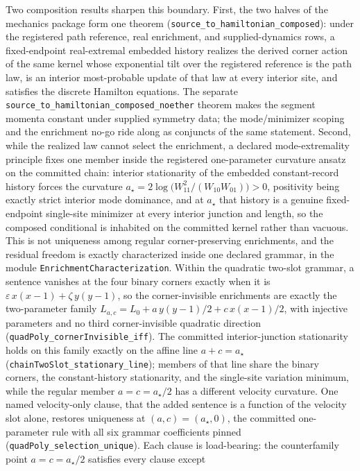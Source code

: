 \documentclass[11pt]{article}
\begin{document}
Two composition results sharpen this boundary. First, the two halves of
the mechanics package form one theorem
(\texttt{source\_to\_hamiltonian\_composed}): under the registered path
reference, real enrichment, and supplied-dynamics rows, a fixed-endpoint
real-extremal embedded history realizes the derived corner action of the
same kernel whose exponential tilt over the registered reference is the
path law, is an interior most-probable update of that law at every
interior site, and satisfies the discrete Hamilton equations. The separate
\texttt{source\_to\_hamiltonian\_composed\_noether} theorem makes the
segment momenta constant under supplied symmetry data; the
mode/minimizer scoping and the enrichment no-go ride along as conjuncts
of the same statement. Second, while the realized law cannot select the
enrichment, a declared mode-extremality principle fixes one member
inside the registered one-parameter curvature ansatz on the committed
chain: interior stationarity of the embedded constant-record history
forces the curvature
\(a_\star=2\log\!\bigl(W_{11}^2/(W_{10}W_{01})\bigr)>0\), positivity
being exactly strict interior mode dominance, and at \(a_\star\) that
history is a genuine fixed-endpoint single-site minimizer at every interior
junction and length, so the
composed conditional is inhabited on the committed kernel rather than
vacuous. This is not uniqueness among regular corner-preserving
enrichments, and the residual freedom is exactly characterized inside one
declared grammar, in the module \texttt{EnrichmentCharacterization}.
Within the quadratic two-slot grammar, a sentence vanishes at the four
binary corners exactly when it is \(\varepsilon\,x(x-1)+\zeta\,y(y-1)\),
so the corner-invisible enrichments are exactly the two-parameter family
\(L_{a,c}=L_0+a\,y(y-1)/2+c\,x(x-1)/2\), with injective parameters and no
third corner-invisible quadratic direction
(\texttt{quadPoly\_cornerInvisible\_iff}). The committed interior-junction
stationarity holds on this family exactly on the affine line
\(a+c=a_\star\) (\texttt{chainTwoSlot\_stationary\_line}); members of that
line share the binary corners, the constant-history stationarity, and the
single-site variation minimum, while the regular member
\(a=c=a_\star/2\) has a different velocity curvature. One named
velocity-only clause, that the added sentence is a function of the
velocity slot alone, restores uniqueness at \((a,c)=(a_\star,0)\), the
committed one-parameter rule with all six grammar coefficients pinned
(\texttt{quadPoly\_selection\_unique}). Each clause is load-bearing: the
counterfamily point \(a=c=a_\star/2\) satisfies every clause except
\end{document}
